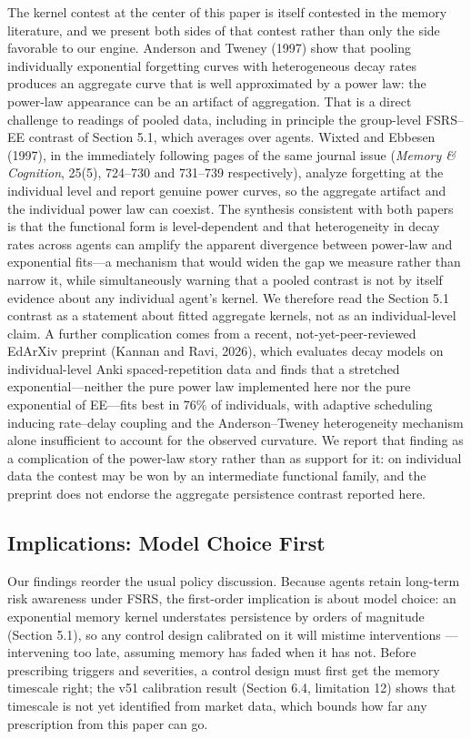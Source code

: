 \documentclass[11pt]{article}
\begin{document}
The kernel contest at the center of this paper is itself contested in the memory literature, and we present both sides of that contest rather than only the side favorable to our engine. Anderson and Tweney (1997) show that pooling individually exponential forgetting curves with heterogeneous decay rates produces an aggregate curve that is well approximated by a power law: the power-law appearance can be an artifact of aggregation. That is a direct challenge to readings of pooled data, including in principle the group-level FSRS--EE contrast of Section 5.1, which averages over agents. Wixted and Ebbesen (1997), in the immediately following pages of the same journal issue (\textit{Memory \& Cognition}, 25(5), 724--730 and 731--739 respectively), analyze forgetting at the individual level and report genuine power curves, so the aggregate artifact and the individual power law can coexist. The synthesis consistent with both papers is that the functional form is level-dependent and that heterogeneity in decay rates across agents can amplify the apparent divergence between power-law and exponential fits---a mechanism that would widen the gap we measure rather than narrow it, while simultaneously warning that a pooled contrast is not by itself evidence about any individual agent's kernel. We therefore read the Section 5.1 contrast as a statement about fitted aggregate kernels, not as an individual-level claim. A further complication comes from a recent, not-yet-peer-reviewed EdArXiv preprint (Kannan and Ravi, 2026), which evaluates decay models on individual-level Anki spaced-repetition data and finds that a stretched exponential---neither the pure power law implemented here nor the pure exponential of EE---fits best in 76\% of individuals, with adaptive scheduling inducing rate--delay coupling and the Anderson--Tweney heterogeneity mechanism alone insufficient to account for the observed curvature. We report that finding as a complication of the power-law story rather than as support for it: on individual data the contest may be won by an intermediate functional family, and the preprint does not endorse the aggregate persistence contrast reported here.

\subsection{Implications: Model Choice First}
Our findings reorder the usual policy discussion. Because agents retain long-term risk awareness under FSRS, the first-order implication is about model choice: an exponential memory kernel understates persistence by orders of magnitude (Section 5.1), so any control design calibrated on it will mistime interventions --- intervening too late, assuming memory has faded when it has not. Before prescribing triggers and severities, a control design must first get the memory timescale right; the v51 calibration result (Section 6.4, limitation 12) shows that timescale is not yet identified from market data, which bounds how far any prescription from this paper can go.
\end{document}
